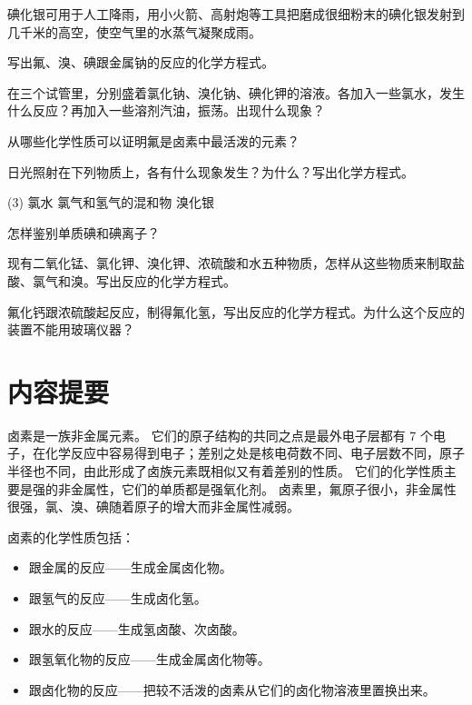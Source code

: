 碘化银可用于人工降雨，用小火箭、高射炮等工具把磨成很细粉末的碘化银发射到几千米的高空，使空气里的水蒸气凝聚成雨。

\begin{Practice}[习题]
  \begin{question}
    \item 写出氟、溴、碘跟金属钠的反应的化学方程式。
    \item 在三个试管里，分别盛着氯化钠、溴化钠、碘化钾的溶液。各加入一些氯水，发生什么反应？再加入一些溶剂汽油，振荡。出现什么现象？
    \item 从哪些化学性质可以证明氟是卤素中最活泼的元素？
    \item 日光照射在下列物质上，各有什么现象发生？为什么？写出化学方程式。
    \begin{tasks}(3)
      \task 氯水
      \task 氯气和氢气的混和物
      \task 溴化银
    \end{tasks} 
    \item 怎样鉴别单质碘和碘离子？
    \item 现有二氧化锰、氯化钾、溴化钾、浓硫酸和水五种物质，怎样从这些物质来制取盐酸、氯气和溴。写出反应的化学方程式。
    \item 氟化钙跟浓硫酸起反应，制得氟化氢，写出反应的化学方程式。为什么这个反应的装置不能用玻璃仪器？
  \end{question}
\end{Practice}

\section*{内容提要}
卤素是一族非金属元素。
它们的原子结构的共同之点是最外电子层都有 7 个电子，在化学反应中容易得到电子；差别之处是核电荷数不同、电子层数不同，原子半径也不同，由此形成了卤族元素既相似又有着差别的性质。
它们的化学性质主要是强的非金属性，它们的单质都是强氧化剂。
卤素里，氟原子很小，非金属性很强，氯、溴、碘随着原子的增大而非金属性减弱。

卤素的化学性质包括：
\begin{itemize}
  \item 跟金属的反应——生成金属卤化物。
  \item 跟氢气的反应——生成卤化氢。
  \item 跟水的反应——生成氢卤酸、次卤酸。
  \item 跟氢氧化物的反应——生成金属卤化物等。
  \item 跟卤化物的反应——把较不活泼的卤素从它们的卤化物溶液里置换出来。
\end{itemize}

